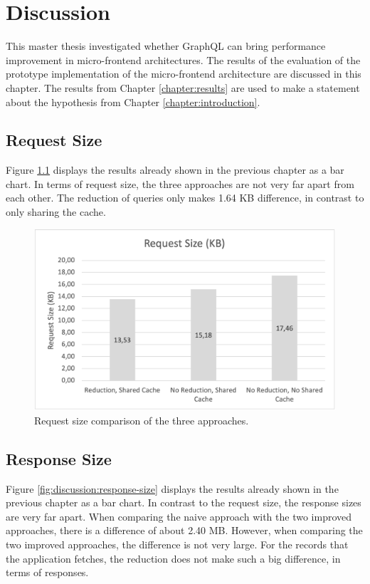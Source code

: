 \chapter{Discussion}\label{chapter:discussion}

This master thesis investigated whether GraphQL can bring performance improvement in micro-frontend architectures. The results of the evaluation of the prototype implementation of the micro-frontend architecture are discussed in this chapter. The results from Chapter \ref{chapter:results} are used to make a statement about the hypothesis from Chapter \ref{chapter:introduction}.

\section{Request Size}

Figure \ref{fig:discussion:request-size} displays the results already shown in the previous chapter as a bar chart. In terms of request size, the three approaches are not very far apart from each other. The reduction of queries only makes 1.64 KB difference, in contrast to only sharing the cache.

\ifshowImages
\begin{figure}[H]
\centering
\includegraphics[width=0.8\linewidth]{images/discussion/request-size.png}
\caption{Request size comparison of the three approaches.}\label{fig:discussion:request-size}
\end{figure}
\fi

\section{Response Size}

Figure \ref{fig:discussion:response-size} displays the results already shown in the previous chapter as a bar chart. In contrast to the request size, the response sizes are very far apart. When comparing the naive approach with the two improved approaches, there is a difference of about 2.40 MB. However, when comparing the two improved approaches, the difference is not very large. For the records that the application fetches, the reduction does not make such a big difference, in terms of responses.

